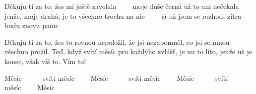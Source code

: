 \resetVars
{}
\MakeHeader
\Lyrics

Děkuju ti za to, žes mi ještě zavolala~~~~
moje duše černá už to ani nečekala~~~~
jenže, moje drahá, je to všechno trochu na nic~~~~
já už jsem se rozhod, zítra budu znovu panic~~~~

Děkuju ti za to, žes to rovnou nepoložil,
že jsi nezapomněl, co jsi se mnou všechno prožil.
Teď, když svítí měsíc pro každýho zvlášť, je mi to líto,
jenže už je konec, však víš to. Vím to!

Měsíc~~~~~~svítí měsíc~~~~
Měsíc~~~~~~svítí měsíc~~~~
Měsíc~~~~~~svítí měsíc~~~~
Měsíc

\Next
